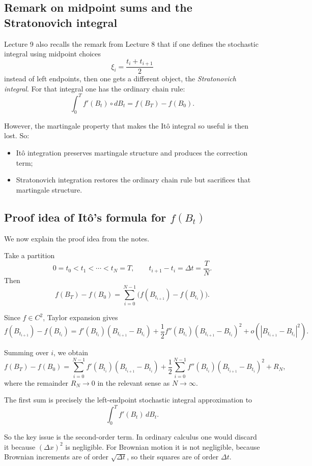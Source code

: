 \documentclass[11pt]{article}
\theoremstyle{definition}
\begin{document}
\subsection{Remark on midpoint sums and the Stratonovich integral}

Lecture 9 also recalls the remark from Lecture 8 that if one defines the stochastic integral using midpoint choices
\[
\xi_i=\frac{t_i+t_{i+1}}{2}
\]
instead of left endpoints, then one gets a different object, the \emph{Stratonovich integral}. For that integral one has the ordinary chain rule:
\[
\int_0^T f'(B_t)\circ dB_t=f(B_T)-f(B_0).
\]

However, the martingale property that makes the It\^o integral so useful is then lost. So:
\begin{itemize}[leftmargin=2em]
    \item It\^o integration preserves martingale structure and produces the correction term;
    \item Stratonovich integration restores the ordinary chain rule but sacrifices that martingale structure.
\end{itemize}

\subsection[Proof idea of Ito's formula for f(Bt)]{Proof idea of It\^o's formula for \texorpdfstring{$f(B_t)$}{f(Bt)}}

We now explain the proof idea from the notes.

Take a partition
\[
0=t_0<t_1<\cdots<t_N=T,
\qquad
t_{i+1}-t_i=\Delta t=\frac{T}{N}.
\]
Then
\[
f(B_T)-f(B_0)
=
\sum_{i=0}^{N-1}\bigl(f(B_{t_{i+1}})-f(B_{t_i})\bigr).
\]

Since \(f\in C^2\), Taylor expansion gives
\[
f(B_{t_{i+1}})-f(B_{t_i})
=
f'(B_{t_i})(B_{t_{i+1}}-B_{t_i})
+
\frac12 f''(B_{t_i})(B_{t_{i+1}}-B_{t_i})^2
+
o\!\left(|B_{t_{i+1}}-B_{t_i}|^2\right).
\]

Summing over \(i\), we obtain
\[
f(B_T)-f(B_0)
=
\sum_{i=0}^{N-1} f'(B_{t_i})(B_{t_{i+1}}-B_{t_i})
+
\frac12\sum_{i=0}^{N-1} f''(B_{t_i})(B_{t_{i+1}}-B_{t_i})^2
+
R_N,
\]
where the remainder \(R_N\to 0\) in the relevant sense as \(N\to\infty\).

The first sum is precisely the left-endpoint stochastic integral approximation to
\[
\int_0^T f'(B_t)\,dB_t.
\]

So the key issue is the second-order term. In ordinary calculus one would discard it because \((\Delta x)^2\) is negligible. For Brownian motion it is not negligible, because Brownian increments are of order \(\sqrt{\Delta t}\), so their squares are of order \(\Delta t\).
\end{document}
